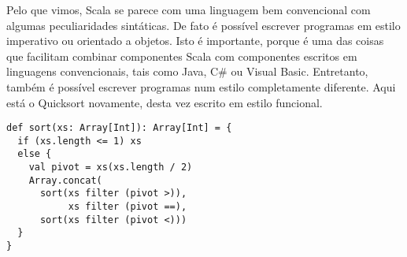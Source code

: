%
Pelo que vimos, Scala se parece com uma linguagem bem convencional 
com algumas peculiaridades sintáticas. De fato é possível escrever
programas em estilo imperativo ou orientado a objetos. Isto é 
importante, porque é uma das coisas que facilitam combinar componentes
Scala com componentes escritos em linguagens convencionais, tais como Java,
C\# ou Visual Basic.
Entretanto, também é possível escrever programas num estilo completamente
diferente. Aqui está o Quicksort novamente, desta vez escrito em 
estilo funcional.
\begin{lstlisting}
def sort(xs: Array[Int]): Array[Int] = {
  if (xs.length <= 1) xs
  else {
    val pivot = xs(xs.length / 2)
    Array.concat(
      sort(xs filter (pivot >)),
           xs filter (pivot ==),
      sort(xs filter (pivot <)))
  }
}
\end{lstlisting}
